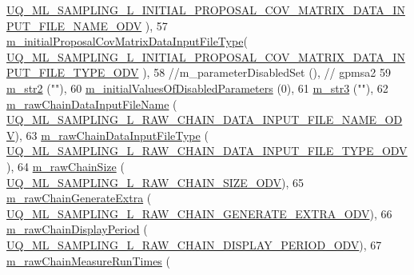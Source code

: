 \begin{DoxyCode}
      \hyperlink{_m_l_sampling_level_options_8h_a0be98afc1e4128037c66a7867514a9de}{UQ\_ML\_SAMPLING\_L\_INITIAL\_PROPOSAL\_COV\_MATRIX\_DATA\_INPUT\_FILE\_NAME\_ODV}
      ),
57   \hyperlink{class_q_u_e_s_o_1_1_m_l_sampling_level_options_a6e6ea2f36afd7b6a6900eaf44165a796}{m\_initialProposalCovMatrixDataInputFileType}(
      \hyperlink{_m_l_sampling_level_options_8h_a18efdcdebf465f0403942698b73c6d3c}{UQ\_ML\_SAMPLING\_L\_INITIAL\_PROPOSAL\_COV\_MATRIX\_DATA\_INPUT\_FILE\_TYPE\_ODV}
      ),
58 \textcolor{comment}{//m\_parameterDisabledSet                     (), // gpmsa2}
59   \hyperlink{class_q_u_e_s_o_1_1_m_l_sampling_level_options_ab91c7af5bfcfeb0466970713e2655e3a}{m\_str2}                                     (\textcolor{stringliteral}{""}),
60   \hyperlink{class_q_u_e_s_o_1_1_m_l_sampling_level_options_a50cbdab5fe9fbda97aca16d206888a18}{m\_initialValuesOfDisabledParameters}        (0),
61   \hyperlink{class_q_u_e_s_o_1_1_m_l_sampling_level_options_ab373068cdb371c781603dbb2b75ae14d}{m\_str3}                                     (\textcolor{stringliteral}{""}),
62   \hyperlink{class_q_u_e_s_o_1_1_m_l_sampling_level_options_a192498743c73fa9244c8652530beebb2}{m\_rawChainDataInputFileName}                (
      \hyperlink{_m_l_sampling_level_options_8h_ae013c6f6194b25b5aff516c4713ec754}{UQ\_ML\_SAMPLING\_L\_RAW\_CHAIN\_DATA\_INPUT\_FILE\_NAME\_ODV}),
63   \hyperlink{class_q_u_e_s_o_1_1_m_l_sampling_level_options_af216317de1aba551bfddd2be38e26898}{m\_rawChainDataInputFileType}                (
      \hyperlink{_m_l_sampling_level_options_8h_ad97a2257f593742369592cae980d9d64}{UQ\_ML\_SAMPLING\_L\_RAW\_CHAIN\_DATA\_INPUT\_FILE\_TYPE\_ODV}),
64   \hyperlink{class_q_u_e_s_o_1_1_m_l_sampling_level_options_a8ab85efacd9881ab35b9f01b6e4fc5a3}{m\_rawChainSize}                             (
      \hyperlink{_m_l_sampling_level_options_8h_a75cd28cd43f8ada797c48eefba87cd8f}{UQ\_ML\_SAMPLING\_L\_RAW\_CHAIN\_SIZE\_ODV}),
65   \hyperlink{class_q_u_e_s_o_1_1_m_l_sampling_level_options_ab0dda87d92a759b277d07157def23174}{m\_rawChainGenerateExtra}                    (
      \hyperlink{_m_l_sampling_level_options_8h_a5a006d0da54da5d55dada91dab3dc1d4}{UQ\_ML\_SAMPLING\_L\_RAW\_CHAIN\_GENERATE\_EXTRA\_ODV}),
66   \hyperlink{class_q_u_e_s_o_1_1_m_l_sampling_level_options_a6d0e080a6b428a8e6c8fed14c597c883}{m\_rawChainDisplayPeriod}                    (
      \hyperlink{_m_l_sampling_level_options_8h_a48fb0cb12f3cb231928e3f61ed524f03}{UQ\_ML\_SAMPLING\_L\_RAW\_CHAIN\_DISPLAY\_PERIOD\_ODV}),
67   \hyperlink{class_q_u_e_s_o_1_1_m_l_sampling_level_options_ad93ee62195c418eedb55877009102cab}{m\_rawChainMeasureRunTimes}                  (

\end{DoxyCode}
